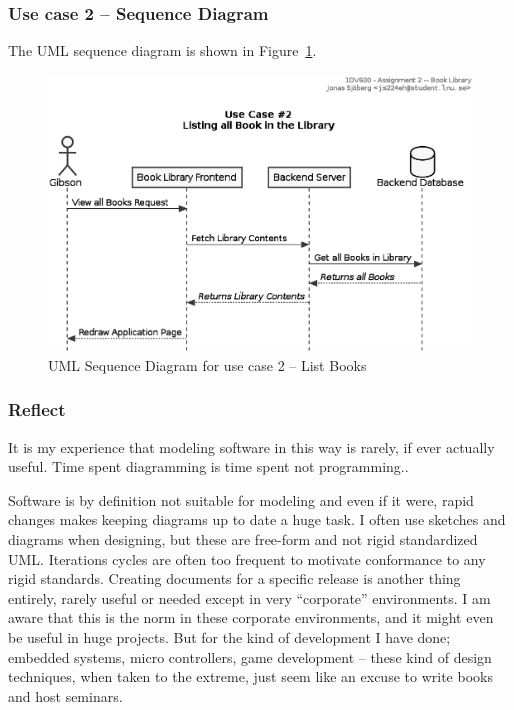 

\subsubsection{Use case 2 -- Sequence Diagram}\label{task-1a-usecase2seq}
The UML sequence diagram is shown in Figure~\ref{fig:uml-usecase2seq}.

\begin{figure}[htbp]
  \centering
  \includegraphics[width=0.75\linewidth]{include/uml-use-case-2-seq.eps}
  \caption{UML Sequence Diagram for use case 2 -- List Books}
  \label{fig:uml-usecase2seq}
\end{figure}


\subsubsection{Reflect}\label{task-1a-reflect}
It is my experience that modeling software in this way is rarely, if ever
actually useful. Time spent diagramming is time spent not programming..

Software is by definition not suitable for modeling and even if it were, rapid
changes makes keeping diagrams up to date a huge task.  I often use sketches
and diagrams when designing, but these are free-form and not rigid standardized
UML. Iterations cycles are often too frequent to motivate conformance to any
rigid standards. Creating documents for a specific release is another thing
entirely, rarely useful or needed except in very ``corporate'' environments.  I
am aware that this is the norm in these corporate environments, and it might
even be useful in huge projects.  But for the kind of development I have done;
embedded systems, micro controllers, game development -- these kind of design
techniques, when taken to the extreme, just seem like an excuse to write books
and host seminars. \cite{use-case-critiques} \cite{use-case-critique}

